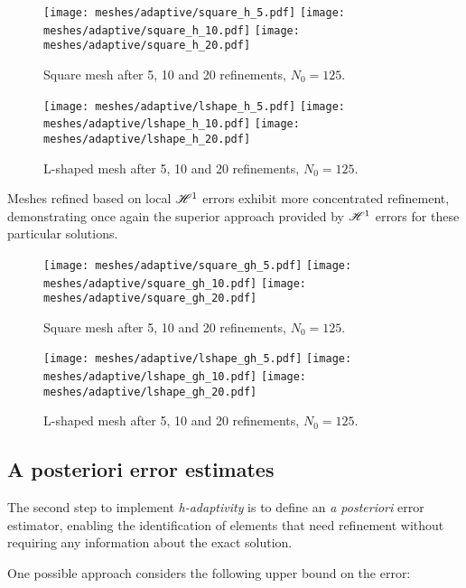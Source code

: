 \begin{figure}[!ht]
	\centering
	\texttt{[image: meshes/adaptive/square\_h\_5.pdf]}
	\texttt{[image: meshes/adaptive/square\_h\_10.pdf]}
	\texttt{[image: meshes/adaptive/square\_h\_20.pdf]}
	\caption{Square mesh after 5, 10 and 20 refinements, $N_0 = 125$.}
\end{figure}

\begin{figure}[!ht]
	\centering
	\texttt{[image: meshes/adaptive/lshape\_h\_5.pdf]}
	\texttt{[image: meshes/adaptive/lshape\_h\_10.pdf]}
	\texttt{[image: meshes/adaptive/lshape\_h\_20.pdf]}
	\caption{L-shaped mesh after 5, 10 and 20 refinements, $N_0 = 125$.}
\end{figure}

\newpage

Meshes refined based on local $\mathscr{H}^1$ errors exhibit more concentrated refinement, demonstrating once again the superior approach provided by $\mathscr{H}^1$ errors for these particular solutions.

\begin{figure}[!ht]
	\centering
	\texttt{[image: meshes/adaptive/square\_gh\_5.pdf]}
	\texttt{[image: meshes/adaptive/square\_gh\_10.pdf]}
	\texttt{[image: meshes/adaptive/square\_gh\_20.pdf]}
	\caption{Square mesh after 5, 10 and 20 refinements, $N_0 = 125$.}
\end{figure}

\begin{figure}[!ht]
	\centering
	\texttt{[image: meshes/adaptive/lshape\_gh\_5.pdf]}
	\texttt{[image: meshes/adaptive/lshape\_gh\_10.pdf]}
	\texttt{[image: meshes/adaptive/lshape\_gh\_20.pdf]}
	\caption{L-shaped mesh after 5, 10 and 20 refinements, $N_0 = 125$.}
\end{figure}

\newpage
\subsection{A posteriori error estimates}

The second step to implement \textit{h-adaptivity} is to define an \textit{a posteriori} error estimator, enabling the identification of elements that need refinement without requiring any information about the exact solution.

\cite{Cangiani2023} One possible approach considers the following upper bound on the error:

